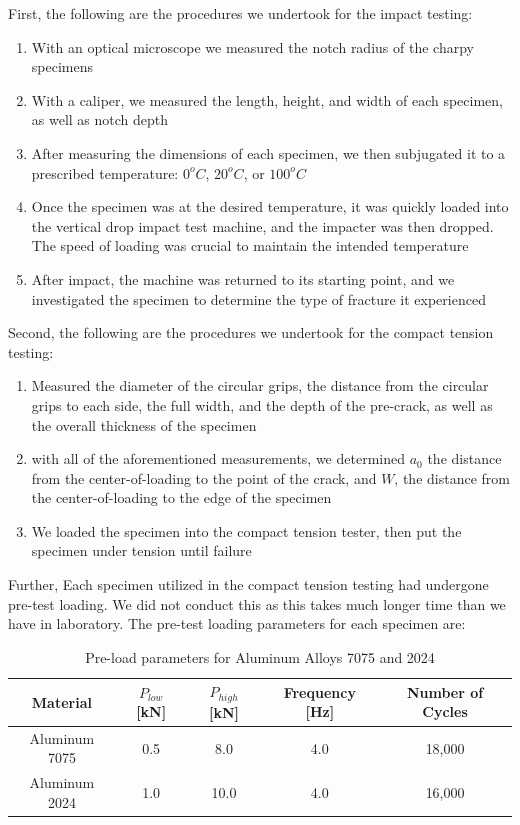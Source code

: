 \documentclass{article}
\begin{document}
First, the following are the procedures we undertook for the impact testing:
\begin{enumerate}
    \item With an optical microscope we measured the notch radius of the charpy specimens
    \item With a caliper, we measured the length, height, and width of each specimen, as well as notch depth
    \item After measuring the dimensions of each specimen, we then subjugated it to a prescribed temperature: $0 ^oC$, $20 ^oC$, or $100 ^oC$
    \item Once the specimen was at the desired temperature, it was quickly loaded into the vertical drop impact test machine, and the impacter was then dropped. The speed of loading was crucial to maintain the intended temperature
    \item After impact, the machine was returned to its starting point, and we investigated the specimen to determine the type of fracture it experienced
\end{enumerate}

Second, the following are the procedures we undertook for the compact tension testing: 

\begin{enumerate}
    \item Measured the diameter of the circular grips, the distance from the circular grips to each side, the full width, and the depth of the pre-crack, as well as the overall thickness of the specimen
    \item with all of the aforementioned measurements, we determined $a_0$ the distance from the center-of-loading to the point of the crack, and $W$, the distance from the center-of-loading to the edge of the specimen
    \item We loaded the specimen into the compact tension tester, then put the specimen under tension until failure
\end{enumerate}

Further, Each specimen utilized in the compact tension testing had undergone pre-test loading. We did not conduct this as this takes much longer time than we have in laboratory. The pre-test loading parameters for each specimen are:

\begin{table}[!h!]
    \centering
    \caption{Pre-load parameters for Aluminum Alloys 7075 and 2024 }
    \begin{tabular}{|c|c|c|c|c|}
        \midrule
        \bottomrule
         Material & $P_{low}$  [kN] & $P_{high}$  [kN]& Frequency  [Hz] & Number of Cycles \\
         \toprule
         \bottomrule
         Aluminum 7075 & 0.5 & 8.0 & 4.0 & 18,000 \\
         \hline
         Aluminum 2024 & 1.0 & 10.0 & 4.0 & 16,000 \\
         \hline
    \end{tabular}
    \label{tab:preloadParams}
\end{table}
\end{document}

